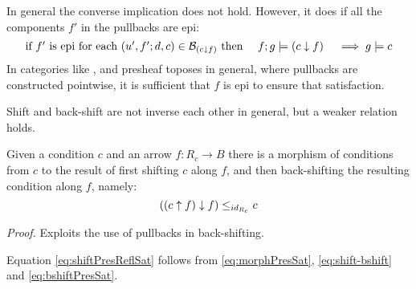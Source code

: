 In general the converse implication does not hold. However, it does if all the components $f'$ in the pullbacks are epi:
\begin{equation}
    \label{eq:bshiftPresSat}
    \mbox{if $f'$ is epi for each $(u',f';d,c)\in \mathcal{B}_{(c\downarrow f)}$ then }
    \quad f;g \models (c\downarrow f)
     \quad \implies g \models c
\end{equation}
In categories like ,  and presheaf toposes in general, where pullbacks are constructed pointwise, it is sufficient that $f$ is epi to ensure that satisfaction.

Shift and back-shift are not inverse each other in general, but a weaker relation holds.

\begin{proposition}
    Given a condition $c$ and an arrow $f:R_c \to B$ there is a morphism of conditions from $c$ to the result of first shifting $c$ along $f$, and then back-shifting the resulting condition along $f$, namely:
\begin{equation}
    \label{eq:shift-bshift}
    ((c\uparrow f)\downarrow f) \leq_{id_{R_c}} c
\end{equation}    
\end{proposition}
\emph{Proof.} Exploits the use of pullbacks in back-shifting.

\begin{proposition}
    Equation \eqref{eq:shiftPresReflSat} follows from \eqref{eq:morphPresSat}, \eqref{eq:shift-bshift} and \eqref{eq:bshiftPresSat}.
\end{proposition}
